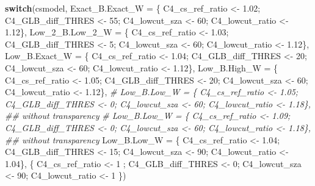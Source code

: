 \documentclass[
  10pt,
  a4paper,oneside]{article}
\newenvironment{Shaded}{\begin{snugshade}}{\end{snugshade}}
\newcommand{\AttributeTok}[1]{\textcolor[rgb]{0.77,0.63,0.00}{#1}}
\newcommand{\CommentTok}[1]{\textcolor[rgb]{0.56,0.35,0.01}{\textit{#1}}}
\newcommand{\ControlFlowTok}[1]{\textcolor[rgb]{0.13,0.29,0.53}{\textbf{#1}}}
\newcommand{\DecValTok}[1]{\textcolor[rgb]{0.00,0.00,0.81}{#1}}
\newcommand{\FloatTok}[1]{\textcolor[rgb]{0.00,0.00,0.81}{#1}}
\newcommand{\NormalTok}[1]{#1}
\newcommand{\OtherTok}[1]{\textcolor[rgb]{0.56,0.35,0.01}{#1}}
\begin{document}
\begin{Shaded}
\begin{Highlighting}[]
\ControlFlowTok{switch}\NormalTok{(csmodel,}
       \AttributeTok{Exact\_B.Exact\_W =}\NormalTok{ \{ C4\_cs\_ref\_ratio }\OtherTok{\textless{}{-}} \FloatTok{1.02}\NormalTok{; C4\_GLB\_diff\_THRES }\OtherTok{\textless{}{-}} \DecValTok{55}\NormalTok{; C4\_lowcut\_sza }\OtherTok{\textless{}{-}} \DecValTok{60}\NormalTok{; C4\_lowcut\_ratio }\OtherTok{\textless{}{-}} \FloatTok{1.12}\NormalTok{\},}
       \AttributeTok{Low\_2\_B.Low\_2\_W =}\NormalTok{ \{ C4\_cs\_ref\_ratio }\OtherTok{\textless{}{-}} \FloatTok{1.03}\NormalTok{; C4\_GLB\_diff\_THRES }\OtherTok{\textless{}{-}}  \DecValTok{5}\NormalTok{; C4\_lowcut\_sza }\OtherTok{\textless{}{-}} \DecValTok{60}\NormalTok{; C4\_lowcut\_ratio }\OtherTok{\textless{}{-}} \FloatTok{1.12}\NormalTok{\},}
       \AttributeTok{Low\_B.Exact\_W   =}\NormalTok{ \{ C4\_cs\_ref\_ratio }\OtherTok{\textless{}{-}} \FloatTok{1.04}\NormalTok{; C4\_GLB\_diff\_THRES }\OtherTok{\textless{}{-}} \DecValTok{20}\NormalTok{; C4\_lowcut\_sza }\OtherTok{\textless{}{-}} \DecValTok{60}\NormalTok{; C4\_lowcut\_ratio }\OtherTok{\textless{}{-}} \FloatTok{1.12}\NormalTok{\},}
       \AttributeTok{Low\_B.High\_W    =}\NormalTok{ \{ C4\_cs\_ref\_ratio }\OtherTok{\textless{}{-}} \FloatTok{1.05}\NormalTok{; C4\_GLB\_diff\_THRES }\OtherTok{\textless{}{-}} \DecValTok{20}\NormalTok{; C4\_lowcut\_sza }\OtherTok{\textless{}{-}} \DecValTok{60}\NormalTok{; C4\_lowcut\_ratio }\OtherTok{\textless{}{-}} \FloatTok{1.12}\NormalTok{\},}
       \CommentTok{\# Low\_B.Low\_W     = \{ C4\_cs\_ref\_ratio \textless{}{-} 1.05; C4\_GLB\_diff\_THRES \textless{}{-}  0; C4\_lowcut\_sza \textless{}{-} 60; C4\_lowcut\_ratio \textless{}{-} 1.18\}, \#\# without transparency}
       \CommentTok{\# Low\_B.Low\_W     = \{ C4\_cs\_ref\_ratio \textless{}{-} 1.09; C4\_GLB\_diff\_THRES \textless{}{-}  0; C4\_lowcut\_sza \textless{}{-} 60; C4\_lowcut\_ratio \textless{}{-} 1.18\}, \#\# without transparency}
       \AttributeTok{Low\_B.Low\_W     =}\NormalTok{ \{ C4\_cs\_ref\_ratio }\OtherTok{\textless{}{-}} \FloatTok{1.04}\NormalTok{; C4\_GLB\_diff\_THRES }\OtherTok{\textless{}{-}} \DecValTok{15}\NormalTok{; C4\_lowcut\_sza }\OtherTok{\textless{}{-}} \DecValTok{90}\NormalTok{; C4\_lowcut\_ratio }\OtherTok{\textless{}{-}} \FloatTok{1.04}\NormalTok{\},}
\NormalTok{                         \{ C4\_cs\_ref\_ratio }\OtherTok{\textless{}{-}} \DecValTok{1}\NormalTok{   ; C4\_GLB\_diff\_THRES }\OtherTok{\textless{}{-}}  \DecValTok{0}\NormalTok{; C4\_lowcut\_sza }\OtherTok{\textless{}{-}} \DecValTok{90}\NormalTok{; C4\_lowcut\_ratio }\OtherTok{\textless{}{-}} \DecValTok{1}\NormalTok{   \})}



\end{Highlighting}
\end{Shaded}
\end{document}
